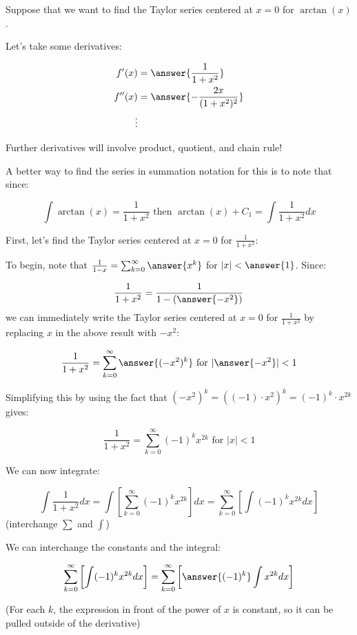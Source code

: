 \documentclass{ximera}
\author{Jim Talamo}
\begin{document}
\begin{exercise}
Suppose that we want to find the Taylor series centered at $x=0$ for $\arctan(x)$.  

Let's take some derivatives:

\begin{align*}
f'(x) &= \answer{\frac{1}{1+x^2}} \\
f''(x) &= \answer{-\frac{2x}{(1+x^2)^2}}\\
\vdots
\end{align*}
 
Further derivatives will involve product, quotient, and chain rule!  

A better way to find the series in summation notation for this is to note that since:

\[
\int \arctan(x) = \frac{1}{1+x^2} \textrm{ then } \arctan(x) +C_1 = \int \frac{1}{1+x^2} dx
\]

First, let's find the Taylor series centered at $x=0$ for $\frac{1}{1+x^2}$:

\begin{exercise}
To begin, note that $\frac{1}{1-x} = \sum_{k=0}^{\infty} \answer{x^k}$ for $|x| < \answer{1}$.  Since:

\[
\frac{1}{1+x^2} = \frac{1}{1- (\answer{-x^2})}
\] 
we can immediately write the Taylor series centered at $x=0$ for $\frac{1}{1+x^2}$ by replacing $x$ in the above result with $-x^2$:

\[
\frac{1}{1+x^2} = \sum_{k=0}^{\infty} \answer{(-x^2)^k} \textrm{ for } |\answer{-x^2}|<1
\] 

\begin{exercise}
Simplifying this by using the fact that $(-x^2)^k = ((-1) \cdot x^2)^k = (-1)^k \cdot x^{2k}$ gives:

\[
\frac{1}{1+x^2} = \sum_{k=0}^{\infty} (-1)^k x^{2k} \textrm{ for } |x|<1
\] 

We can now integrate:


\[
\int \frac{1}{1+x^2} dx =\int \left[\sum_{k=0}^{\infty}  (-1)^k x^{2k}  \right] dx = \sum_{k=0}^{\infty} \left[ \int  (-1)^k x^{2k}  dx \right]
\]
(interchange $\sum$ and $\int$)

We can interchange the constants and the integral:

\[
\sum_{k=0}^{\infty} \left[ \int (-1)^k x^{2k}  dx \right] = \sum_{k=0}^{\infty} \left[ \answer{(-1)^k}\int x^{2k} dx  \right]
\]

(For each $k$, the expression in front of the power of $x$ is constant, so it can be pulled outside of the derivative)


\end{exercise}
\end{exercise}
\end{exercise}
\end{document}
